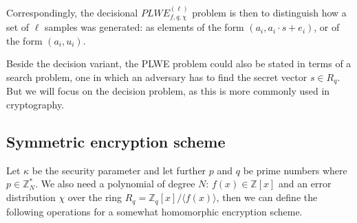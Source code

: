 \documentclass[../main.tex]{subfiles}
\begin{document}
% 

Correspondingly, the decisional $PLWE_{f, q, \chi}^{(\ell)}$ problem is then to distinguish how a set of $\ell$ samples was generated: as elements of the form $(a_i, a_i \cdot s + e_i)$, or of the form $(a_i, u_i)$.

Beside the decision variant, the PLWE problem could also be stated in terms of a search problem, one in which
an adversary has to find the secret vector $s \in R_q$. But we will focus on the decision problem, as this
is more commonly used in cryptography.

\subsection{Symmetric encryption scheme}

Let $\kappa$ be the security parameter and let further $p$ and $q$ be prime numbers where $p \in \mathbb{Z}_N^*$.
We also need a polynomial of degree $N$: $f(x) \in \mathbb{Z}[x]$ and an error distribution $\chi$ over the ring
$R_q = \mathbb{Z}_q[x] / \langle f(x) \rangle$, then we can define the following operations for a somewhat homomorphic
encryption scheme.
\end{document}
